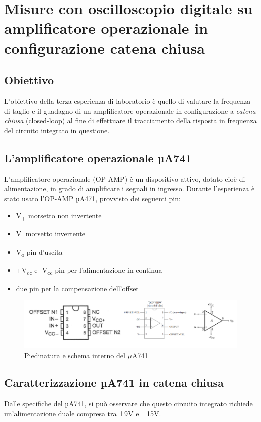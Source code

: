 \chapter{Misure con oscilloscopio digitale su amplificatore operazionale in configurazione catena chiusa}
\label{chap:terza_prova}

\section*{Obiettivo}
L'obiettivo della terza esperienza di laboratorio è quello di valutare la frequenza di taglio e il guadagno di un amplificatore operazionale in configurazione a \emph{catena chiusa} (closed-loop) al fine di effettuare il tracciamento della risposta in frequenza del circuito integrato in questione.

\section{L'amplificatore operazionale µA741}
L'amplificatore operazionale (OP-AMP) è un dispositivo attivo, dotato cioè di alimentazione, in grado  di amplificare i segnali in ingresso. Durante l'esperienza è stato usato l'OP-AMP µA471, provvisto dei seguenti pin:
\begin{itemize}
    \item V\textsubscript{+} morsetto non invertente
    \item V\textsubscript{-} morsetto invertente
    \item V\textsubscript{o} pin d'uscita
    \item +V\textsubscript{cc} e -V\textsubscript{cc} pin per l'alimentazione in continua
    \item due pin per la compensazione dell'offset
\end{itemize}

\begin{figure}
    \centering
    \includegraphics[width=1\linewidth]{media/uA741.png}
    \caption{Piedinatura e schema interno del $\mu$A741}
    \label{fig:Piedinatura e schema interno del uA741}
\end{figure}
\FloatBarrier
\section{Caratterizzazione µA741 in catena chiusa}
Dalle specifiche del µA741, si può osservare che questo circuito integrato richiede un’alimentazione duale compresa tra ±9V e ±15V.

